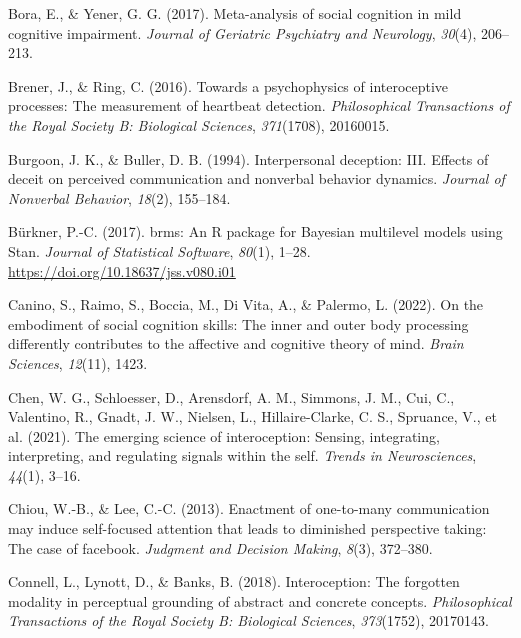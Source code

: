 \documentclass[
  man,mask,floatsintext]{apa6}
\newlength{\cslhangindent}
\newenvironment{CSLReferences}[2] %
 {\begin{list}{}{%
  \setlength{\itemindent}{0pt}
  \setlength{\leftmargin}{0pt}
  \setlength{\parsep}{0pt}
  \ifodd #1
   \setlength{\leftmargin}{\cslhangindent}
   \setlength{\itemindent}{-1\cslhangindent}
  \fi
  \setlength{\itemsep}{#2\baselineskip}}}
 {\end{list}}
\begin{document}
\begin{CSLReferences}{1}{0}
Bora, E., \& Yener, G. G. (2017). Meta-analysis of social cognition in mild cognitive impairment. \emph{Journal of Geriatric Psychiatry and Neurology}, \emph{30}(4), 206--213.

Brener, J., \& Ring, C. (2016). Towards a psychophysics of interoceptive processes: The measurement of heartbeat detection. \emph{Philosophical Transactions of the Royal Society B: Biological Sciences}, \emph{371}(1708), 20160015.

Burgoon, J. K., \& Buller, D. B. (1994). Interpersonal deception: III. Effects of deceit on perceived communication and nonverbal behavior dynamics. \emph{Journal of Nonverbal Behavior}, \emph{18}(2), 155--184.

Bürkner, P.-C. (2017). {brms}: An {R} package for {Bayesian} multilevel models using {Stan}. \emph{Journal of Statistical Software}, \emph{80}(1), 1--28. \url{https://doi.org/10.18637/jss.v080.i01}

Canino, S., Raimo, S., Boccia, M., Di Vita, A., \& Palermo, L. (2022). On the embodiment of social cognition skills: The inner and outer body processing differently contributes to the affective and cognitive theory of mind. \emph{Brain Sciences}, \emph{12}(11), 1423.

Chen, W. G., Schloesser, D., Arensdorf, A. M., Simmons, J. M., Cui, C., Valentino, R., Gnadt, J. W., Nielsen, L., Hillaire-Clarke, C. S., Spruance, V., et al. (2021). The emerging science of interoception: Sensing, integrating, interpreting, and regulating signals within the self. \emph{Trends in Neurosciences}, \emph{44}(1), 3--16.

Chiou, W.-B., \& Lee, C.-C. (2013). Enactment of one-to-many communication may induce self-focused attention that leads to diminished perspective taking: The case of facebook. \emph{Judgment and Decision Making}, \emph{8}(3), 372--380.

Connell, L., Lynott, D., \& Banks, B. (2018). Interoception: The forgotten modality in perceptual grounding of abstract and concrete concepts. \emph{Philosophical Transactions of the Royal Society B: Biological Sciences}, \emph{373}(1752), 20170143.


\end{CSLReferences}
\end{document}

